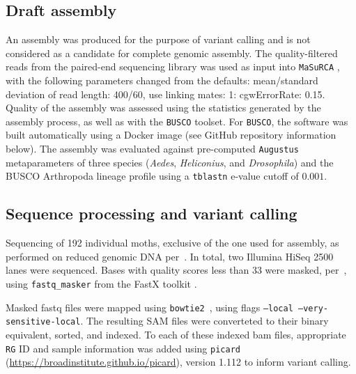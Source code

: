 \documentclass[fleqn,11pt]{wlpeerj}
\begin{document}
\subsection*{Draft assembly}

An assembly was produced for the purpose of variant calling and is not
considered as a candidate for complete genomic assembly. The quality-filtered
reads from the paired-end sequencing library was used as input into
\texttt{MaSuRCA} \citep[][version 2.3.2]{Zimin:2013kn}, with the following
parameters changed from the defaults: mean/standard deviation of read length:
400/60, use linking mates: 1: cgwErrorRate: 0.15.  Quality of the assembly was
assessed using the statistics generated by the assembly process, as well as with the
\texttt{BUSCO} \citep[][version 1.1b1]{Simao:2015kk} toolset. For
\texttt{BUSCO}, the software was built automatically using a Docker image (see
GitHub repository information below). The assembly was evaluated against
pre-computed \texttt{Augustus} \citep{Stanke:2003eo} metaparameters of  three
species (\textit{Aedes}, \textit{Heliconius}, and \textit{Drosophila}) and the
BUSCO Arthropoda lineage profile using a \texttt{tblastn} e-value cutoff of
$0.001$.

\subsection*{Sequence processing and variant calling} Sequencing of 192
individual moths, exclusive of the one used for assembly,  as performed on
reduced genomic DNA per~\cite{PARCHMAN:2012ca}. In total, two  Illumina HiSeq
2500 lanes were sequenced. Bases with quality scores less than 33 were masked,
per~\cite{Yun:2014dn},  using \texttt{fastq\_masker} from the FastX toolkit
\citep[][version 0.0.14]{citeulike:9103573}.

Masked fastq files were mapped using \texttt{bowtie2}~\citep[][version
2.2.4]{Langmead:2012jh}, using flags  \texttt{--local
--very-sensitive-local}.  The resulting  SAM files were converteted to their
binary equivalent, sorted, and indexed. To each of these indexed bam files,
appropriate \texttt{RG} ID and sample information was added using
\texttt{picard} \\ (\url{https://broadinstitute.github.io/picard}), version 1.112
to inform variant calling.
\end{document}
